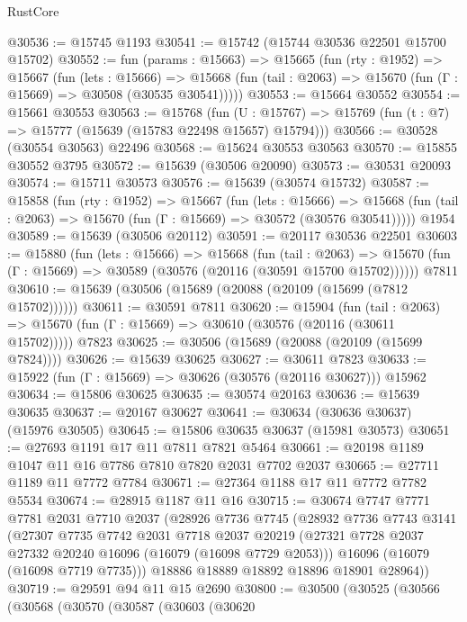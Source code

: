 \begin{lexlean}{RustCore}
\begin{coremodule}
@30536 := @15745 @1193
@30541 := @15742 (@15744 @30536 @22501 @15700 @15702)
@30552 := fun (params : @15663) =>
  @15665
    (fun (rty : @1952) =>
    @15667
      (fun (lets : @15666) =>
      @15668 (fun (tail : @2063) => @15670 (fun (Γ : @15669) => @30508 (@30535 @30541)))))
@30553 := @15664 @30552
@30554 := @15661 @30553
@30563 := @15768
    (fun (U : @15767) => @15769 (fun (t : @7) => @15777 (@15639 (@15783 @22498 @15657) @15794)))
@30566 := @30528 (@30554 @30563) @22496
@30568 := @15624 @30553 @30563
@30570 := @15855 @30552 @3795
@30572 := @15639 (@30506 @20090)
@30573 := @30531 @20093
@30574 := @15711 @30573
@30576 := @15639 (@30574 @15732)
@30587 := @15858
    (fun (rty : @1952) =>
    @15667
      (fun (lets : @15666) =>
      @15668 (fun (tail : @2063) => @15670 (fun (Γ : @15669) => @30572 (@30576 @30541)))))
    @1954
@30589 := @15639 (@30506 @20112)
@30591 := @20117 @30536 @22501
@30603 := @15880
    (fun (lets : @15666) =>
    @15668
      (fun (tail : @2063) =>
      @15670 (fun (Γ : @15669) => @30589 (@30576 (@20116 (@30591 @15700 @15702))))))
    @7811
@30610 := @15639 (@30506 (@15689 (@20088 (@20109 (@15699 (@7812 @15702))))))
@30611 := @30591 @7811
@30620 := @15904
    (fun (tail : @2063) => @15670 (fun (Γ : @15669) => @30610 (@30576 (@20116 (@30611 @15702)))))
    @7823
@30625 := @30506 (@15689 (@20088 (@20109 (@15699 @7824))))
@30626 := @15639 @30625
@30627 := @30611 @7823
@30633 := @15922 (fun (Γ : @15669) => @30626 (@30576 (@20116 @30627))) @15962
@30634 := @15806 @30625
@30635 := @30574 @20163
@30636 := @15639 @30635
@30637 := @20167 @30627
@30641 := @30634 (@30636 @30637) (@15976 @30505)
@30645 := @15806 @30635 @30637 (@15981 @30573)
@30651 := @27693 @1191 @17 @11 @7811 @7821 @5464
@30661 := @20198 @1189 @1047 @11 @16 @7786 @7810 @7820 @2031 @7702 @2037
@30665 := @27711 @1189 @11 @7772 @7784
@30671 := @27364 @1188 @17 @11 @7772 @7782 @5534
@30674 := @28915 @1187 @11 @16
@30715 := @30674
    @7747
    @7771
    @7781
    @2031
    @7710
    @2037
    (@28926
      @7736
      @7745
      (@28932
        @7736
        @7743
        @3141
        (@27307
          @7735
          @7742
          @2031
          @7718
          @2037
          @20219
          (@27321 @7728 @2037 @27332 @20240 @16096 (@16079 (@16098 @7729 @2053)))
          @16096
          (@16079 (@16098 @7719 @7735)))
        @18886
        @18889
        @18892
        @18896
        @18901
        @28964))
@30719 := @29591 @94 @11 @15 @2690
@30800 := @30500
    (@30525
      (@30566
        (@30568
          (@30570
            (@30587
              (@30603
                (@30620

\end{coremodule}
\end{lexlean}
